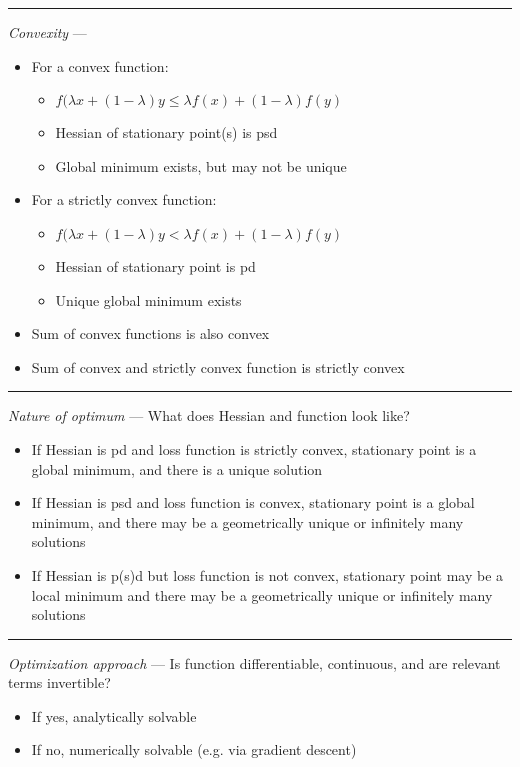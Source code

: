 {\color{lightgray}\hrule height 0.001mm}

\emph{Convexity} --- 
\begin{itemize}
    \item For a convex function: 
    \begin{itemize}
        \item $f(\lambda x + (1-\lambda)y \leq \lambda f(x) + (1-\lambda) f(y)$
        \item Hessian of stationary point(s) is psd
        \item Global minimum exists, but may not be unique
    \end{itemize}
    \item For a strictly convex function:
    \begin{itemize}
        \item $f(\lambda x + (1-\lambda)y < \lambda f(x) + (1-\lambda) f(y)$
        \item Hessian of stationary point is pd
        \item Unique global minimum exists 
    \end{itemize}
    \item Sum of convex functions is also convex
    \item Sum of convex and strictly convex function is strictly convex
\end{itemize}

{\color{lightgray}\hrule height 0.001mm}

\emph{Nature of optimum} --- 
What does Hessian and function look like?
\begin{itemize}
    \item If Hessian is pd and loss function is strictly convex, stationary point is a global minimum, and there is a unique solution
    \item If Hessian is psd and loss function is convex, stationary point is a global minimum, and there may be a geometrically unique or infinitely many solutions
    \item If Hessian is p(s)d but loss function is not convex, stationary point may be a local minimum and there may be a geometrically unique or infinitely many solutions
\end{itemize}

{\color{lightgray}\hrule height 0.001mm}

\emph{Optimization approach} --- 
Is function differentiable, continuous, and are relevant terms invertible?
\begin{itemize}
    \item If yes, analytically solvable
    \item If no, numerically solvable (e.g. via gradient descent)
\end{itemize}

